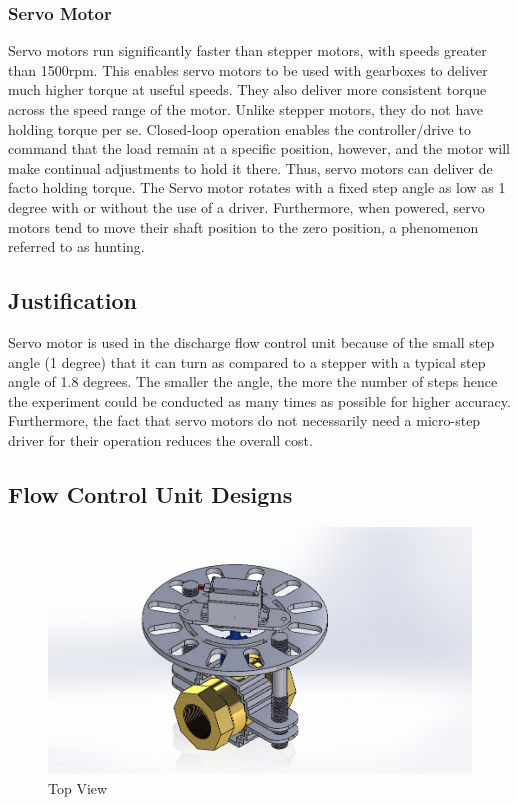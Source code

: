 \subsubsection{Servo Motor}
\par
Servo motors run significantly faster than stepper motors, with speeds greater than 1500rpm. This enables servo motors to be used with gearboxes to deliver much higher torque at useful speeds. They also deliver more consistent torque across the speed range of the motor. Unlike stepper motors, they do not have holding torque per se. Closed-loop operation enables the controller/drive to command that the load remain at a specific position, however, and the motor will make continual adjustments to hold it there. Thus, servo motors can deliver de facto holding torque. The Servo motor rotates with a fixed step angle as low as 1 degree with or without the use of a driver. Furthermore, when powered, servo motors tend to move their shaft position to the zero position, a phenomenon referred to as hunting.
\subsection{Justification}
\par
Servo motor is used in the discharge flow control unit because of the small step angle (1 degree) that it can turn as compared to a stepper with a typical step angle of 1.8 degrees. The smaller the angle, the more the number of steps hence the experiment could be conducted as many times as possible for higher accuracy. Furthermore, the fact that servo motors do not necessarily need a micro-step driver for their operation reduces the overall cost.
\subsection{Flow Control Unit Designs}
\begin{figure}[ht]
\includegraphics[width=0.9\linewidth]{Figures/Image3.jpeg}
\centering
\caption{Top View }
\label{fig:Image3}
\end{figure}

